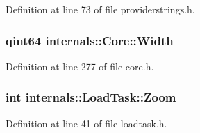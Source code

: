 \-Definition at line 73 of file providerstrings.\-h.

\hypertarget{group___o_p_map_widget_ga3d5e76b481e1832dff58d33176b6a158}{
\subsubsection[{\-Width}]{\setlength{\rightskip}{0pt plus 5cm}qint64 {\bf internals\-::\-Core\-::\-Width}}}\label{group___o_p_map_widget_ga3d5e76b481e1832dff58d33176b6a158}


\-Definition at line 277 of file core.\-h.

\hypertarget{group___o_p_map_widget_gaee096bc3882220e2ed2b8b167cecb9ad}{
\subsubsection[{\-Zoom}]{\setlength{\rightskip}{0pt plus 5cm}int {\bf internals\-::\-Load\-Task\-::\-Zoom}}}\label{group___o_p_map_widget_gaee096bc3882220e2ed2b8b167cecb9ad}


\-Definition at line 41 of file loadtask.\-h.



